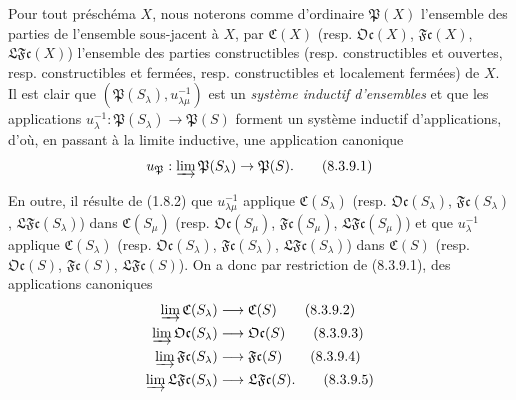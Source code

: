 \begin{env}[8.3.9]
\label{IV.8.3.9-fr}
Pour tout préschéma $X$, nous noterons comme d'ordinaire $\mathfrak P(X)$
l'ensemble des parties de l'ensemble sous-jacent à $X$, par $\mathfrak C(X)$
(resp. $\mathfrak{Oc}(X)$, $\mathfrak{Fc}(X)$, $\mathfrak{LFc}(X)$)
l'ensemble des parties constructibles (resp. constructibles et ouvertes,
resp. constructibles et fermées, resp. constructibles et localement fermées)
de $X$. Il est clair que
$(\mathfrak P(S_\lambda),u_{\lambda\mu}^{-1})$ est un \emph{système inductif
d'ensembles} et que les applications
$u_\lambda^{-1}:\mathfrak P(S_\lambda)\to\mathfrak P(S)$ forment un système
inductif d'applications, d'où, en passant à la limite inductive, une
application canonique
\begin{equation}
u_{\mathfrak P}:\varinjlim\mathfrak P(S_\lambda)\to\mathfrak P(S).
\tag{8.3.9.1}\label{IV.8.3.9.1-fr}
\end{equation}

En outre, il résulte de (1.8.2) que $u_{\lambda\mu}^{-1}$ applique
$\mathfrak C(S_\lambda)$ (resp. $\mathfrak{Oc}(S_\lambda)$,
$\mathfrak{Fc}(S_\lambda)$, $\mathfrak{LFc}(S_\lambda)$) dans
$\mathfrak C(S_\mu)$ (resp. $\mathfrak{Oc}(S_\mu)$,
$\mathfrak{Fc}(S_\mu)$, $\mathfrak{LFc}(S_\mu)$) et que
$u_\lambda^{-1}$ applique $\mathfrak C(S_\lambda)$ (resp.
$\mathfrak{Oc}(S_\lambda)$, $\mathfrak{Fc}(S_\lambda)$,
$\mathfrak{LFc}(S_\lambda)$) dans $\mathfrak C(S)$ (resp.
$\mathfrak{Oc}(S)$, $\mathfrak{Fc}(S)$, $\mathfrak{LFc}(S)$). On a donc par
restriction de (8.3.9.1), des applications canoniques
\begin{align}
\varinjlim\mathfrak C(S_\lambda)&\longrightarrow\mathfrak C(S)
\tag{8.3.9.2}\label{IV.8.3.9.2-fr}\\
\varinjlim\mathfrak{Oc}(S_\lambda)&\longrightarrow\mathfrak{Oc}(S)
\tag{8.3.9.3}\label{IV.8.3.9.3-fr}\\
\varinjlim\mathfrak{Fc}(S_\lambda)&\longrightarrow\mathfrak{Fc}(S)
\tag{8.3.9.4}\label{IV.8.3.9.4-fr}\\
\varinjlim\mathfrak{LFc}(S_\lambda)&\longrightarrow\mathfrak{LFc}(S).
\tag{8.3.9.5}\label{IV.8.3.9.5-fr}
\end{align}
\end{env}

